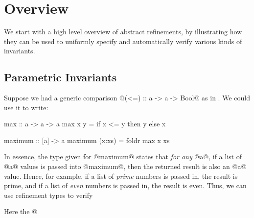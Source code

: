 \section{Overview}\label{sec:overview}

We start with a high level overview of abstract refinements, 
by illustrating how they can be used to uniformly specify and 
automatically verify various kinds of invariants.

\subsection{Parametric Invariants}\label{sec:overview:parametric}

Suppose we had a generic comparison @(<=) :: a -> a -> Bool@ as in
\ocaml.
We could use it to write: 
\begin{code}
  max     :: a -> a -> a
  max x y = if x <= y then y else x 

  maximum :: [a] -> a
  maximum (x:xs) = foldr max x xs
\end{code}
In essence, the type given for @maximum@ states that
\emph{for any} @a@, if a list of @a@ values is passed
into @maximum@, then the returned result is also an @a@
value.
%
Hence, for example, if a list of \emph{prime} numbers 
is passed in, the result is prime, and if a list of 
\emph{even} numbers is passed in, the result is even. 
Thus, we can use refinement types \cite{LiquidPLDI08} 
to verify
%
%
Here the @%
